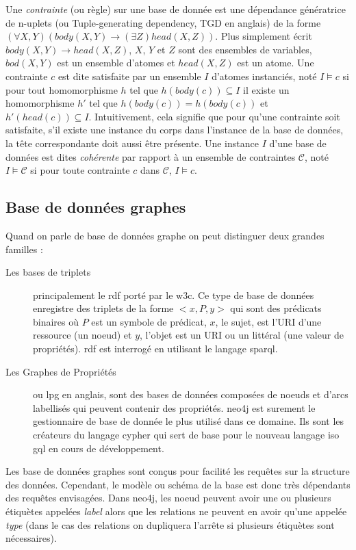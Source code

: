 Une \textit{contrainte} (ou règle) sur une base de donnée est une dépendance génératrice de n-uplets (ou Tuple-generating dependency, TGD en anglais) de la forme $(\forall X, Y)(body(X, Y) \to (\exists Z)head(X, Z))$.
Plus simplement écrit $body(X, Y) \to head(X, Z)$, $X$, $Y$ et $Z$ sont des ensembles de variables, $bod(X, Y)$ est un ensemble d'atomes et $head(X, Z)$ est un atome.
Une contrainte $c$ est dite satisfaite par un ensemble $I$ d'atomes instanciés, noté $I \vDash c$ si pour tout homomorphisme $h$ tel que $h(body(c)) \subseteq I$ il existe un homomorphisme $h'$ tel que $h(body(c)) = h(body(c))$ et $h'(head(c)) \subseteq I$.
Intuitivement, cela signifie que pour qu'une contrainte soit satisfaite, s'il existe une instance du corps dans l'instance de la base de données, la tête correspondante doit aussi être présente.
Une instance $I$ d'une base de données est dites \textit{cohérente} par rapport à un ensemble de contraintes $\mathcal{C}$, noté $I \vDash \mathcal{C}$ si pour toute contrainte $c$ dans $\mathcal{C}$, $I \vDash c$.

\subsection{Base de données graphes}
Quand on parle de base de données graphe on peut distinguer deux grandes familles :
\begin{description}
    \item[Les bases de triplets] principalement le \gls{rdf} porté par le \gls{w3c}.
        Ce type de base de données enregistre des triplets de la forme $<x, P, y>$ qui sont des prédicats binaires où $P$ est un symbole de prédicat, $x$, le sujet, est l'URI d'une ressource (un noeud) et $y$, l'objet est un URI ou un littéral (une valeur de propriétés).
        \gls{rdf} est interrogé en utilisant le langage \gls{sparql}.
    \item[Les Graphes de Propriétés] ou \gls{lpg} en anglais, sont des bases de données composées de noeuds et d'arcs labellisés qui peuvent contenir des propriétés.
        \gls{neo4j} est surement le gestionnaire de base de donnée le plus utilisé dans ce domaine.
        Ils sont les créateurs du langage \gls{cypher} qui sert de base pour le nouveau langage \gls{iso} \gls{gql} en cours de développement.
\end{description}

Les base de données graphes sont conçus pour facilité les requêtes sur la structure des données.
Cependant, le modèle ou schéma de la base est donc très dépendants des requêtes envisagées.
Dans \gls{neo4j}, les noeud peuvent avoir une ou plusieurs étiquètes appelées \textit{label} alors que les relations ne peuvent en avoir qu'une appelée \textit{type} (dans le cas des relations on dupliquera l'arrête si plusieurs étiquètes sont nécessaires).

